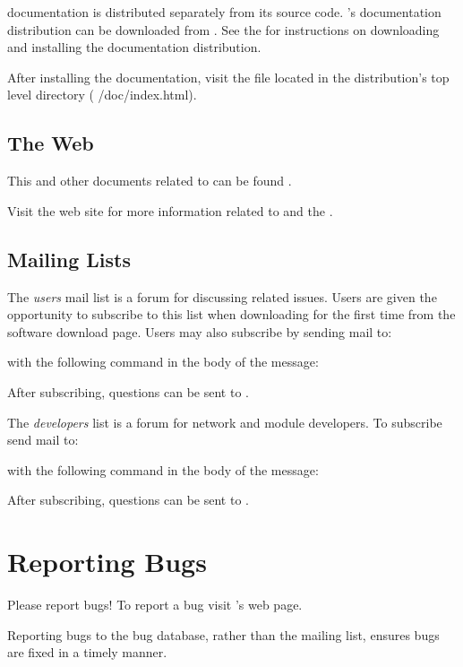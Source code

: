 \sr{} documentation is distributed separately from its source code.
\sr{}'s documentation distribution can be downloaded from
.  See the 
for instructions on downloading and installing the documentation
distribution.

After installing the documentation, visit the
 file located in the distribution's top level
 directory (\ie{} /doc/index.html).

\subsection{The Web}

This and other documents related to \sr{} can be found 
.

Visit the \htmladdnormallinkfoot{\sci}{\sciurl} web site for more
information related to \sr{} and the \scii{}.

\subsection{Mailing Lists}

The \sr{} \emph{users} mail list is a forum for discussing \sr{}
related issues.  Users are given the opportunity to subscribe to this
list when downloading \sr{} for the first time from the software
download page.  Users may also subscribe by sending mail to:


with the following command in the body of the message:


After subscribing,  questions can be sent to
.

The \sr{} \emph{developers} list is a forum for network and module
developers.  To subscribe send mail to:


with the following command in the body of the message:


After subscribing, questions can be sent to
.

\section{Reporting Bugs}
\label{sec:bugs}

Please report bugs!  To report a bug visit \sr{}'s
 web page.

Reporting bugs to the bug database, rather than the mailing list,  ensures
bugs are fixed in a timely manner.
